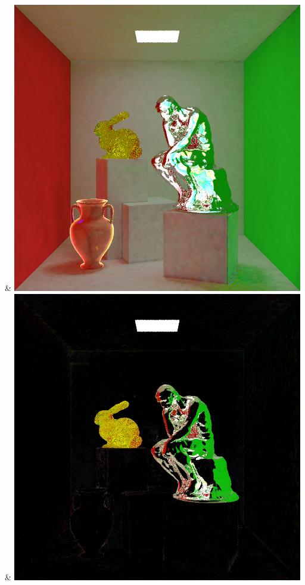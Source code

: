 & \includegraphics[width=\linewidth]{figures/py/tests/quality_comparison/nrc+naive_1spp_thinker.png}
& \includegraphics[width=\linewidth]{figures/py/tests/quality_comparison/nrc+naive+bal_1spp_thinker.png}
